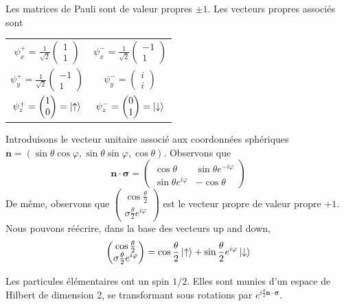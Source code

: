 \documentclass[../notesdecours.tex]{subfiles}
\begin{document}
Les matrices de Pauli sont de valeur propres $\pm 1$. Les vecteurs propres associés sont
\begin{center}
    \begin{tabular}{c|c}
        $\psi_x^+ = \frac{1}{\sqrt{2}} \begin{pmatrix}
            1\\
            1
        \end{pmatrix}$ & $\psi_x^- = \frac{1}{\sqrt{2}} \begin{pmatrix}
            -1\\
            1
        \end{pmatrix}$\\
        $\psi_y^+ = \frac{1}{\sqrt{2}} \begin{pmatrix}
            -1\\
            1
        \end{pmatrix}$ & $\psi_y^- = \begin{pmatrix}
            i\\
            i
        \end{pmatrix}$\\
        $\psi_z^+ = \begin{pmatrix}
            1\\
            0
        \end{pmatrix} = \ket{\uparrow}$ & $\psi_z^- = \begin{pmatrix}
            0\\
            1
        \end{pmatrix} = \ket{\downarrow}$
    \end{tabular}
\end{center}

Introduisons le vecteur unitaire associé aux coordonnées sphériques $\bm{n} = \left(\sin\theta\cos\varphi,\sin\theta\sin\varphi,\cos\theta\right)$. Observons que 
\begin{equation}
    \bm{n}\cdot\bm{\sigma} = \begin{pmatrix}
        \cos\theta & \sin\theta e^{-i\varphi}\\
        \sin\theta e^{i\varphi} & -\cos\theta
    \end{pmatrix}
\end{equation}
De même, observons que $\begin{pmatrix}
    \cos\frac{\theta}{2}\\
    \sigma\frac{\theta}{2}e^{i\varphi}
\end{pmatrix}$ est le vecteur propre de valeur propre $+1$. Nous pouvons réécrire, dans la base des vecteurs up and down,
\begin{equation}
    \begin{pmatrix}
        \cos\frac{\theta}{2}\\
        \sigma\frac{\theta}{2}e^{i\varphi}
    \end{pmatrix} = \cos\frac{\theta}{2}\ket{\uparrow}+\sin\frac{\theta}{2}e^{i\varphi}\ket{\downarrow}
\end{equation}

Les particules élémentaires ont un spin $1/2$. Elles sont munies d'un espace de Hilbert de dimension 2, se transformant sous rotations par $e^{i\frac{\theta}{2}\bm{n}\cdot\bm{\sigma}}$.
\end{document}
